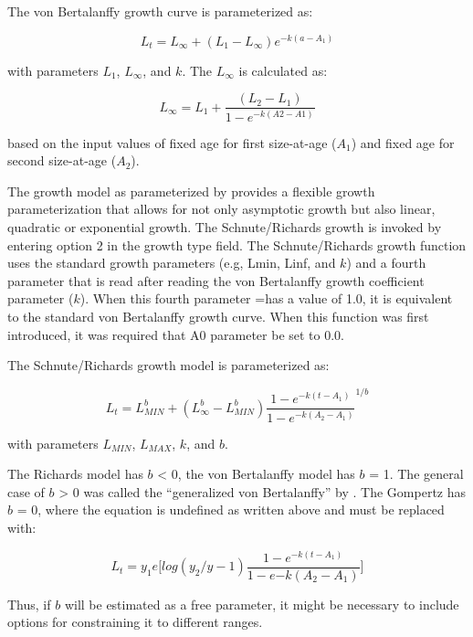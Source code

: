The von Bertalanffy growth curve is parameterized as:

\begin{equation}
	L_t = L_\infty + (L_{1}-L_\infty)e^{-k(a-A_{1})}
\end{equation}

with parameters $L_{1}$, $L_\infty$, and $k$. The $L_\infty$ is calculated as:

\begin{equation}
	L_\infty = L_{1} + \frac{(L_2 - L_1)}{1-e^{-k(A2-A1)}}
\end{equation}

based on the input values of fixed age for first size-at-age ($A_1$) and fixed age for second size-at-age ($A_2$). 

The \citet{richards1959growth} growth model as parameterized by \citet{schnute1981growth} provides a flexible growth parameterization that allows for not only asymptotic growth but also linear, quadratic or exponential growth. The Schnute/Richards growth is invoked by entering option 2 in the growth type field. The Schnute/Richards growth function uses the standard growth parameters (e.g, Lmin, Linf, and $k$) and a fourth parameter that is read after reading the von Bertalanffy growth coefficient parameter ($k$). When this fourth parameter =has a value of 1.0, it is equivalent to the standard von Bertalanffy growth curve. When this function was first introduced, it was required that A0 parameter be set to 0.0.

The Schnute/Richards growth model is parameterized as:

\begin{equation}
		L_t = L_{MIN}^b + (L_\infty^b-L_{MIN}^b)\frac{1-e^{-k(t-A_{1})}}{1-e^{-k(A_2-A_1)}}^{1/b}
\end{equation}

with parameters $L_{MIN}$, $L_{MAX}$, $k$, and $b$.

The Richards model has $b$ < 0, the von Bertalanffy model has $b$ = 1. The general case of $b$ > 0 was called the ``generalized von Bertalanffy'' by \citet{schnute1981growth}. The Gompertz has $b$ = 0, where the equation is undefined as written above and must be replaced with: 

\begin{equation}
		L_t = y_1e\Big[log(y_2/y-1)\frac{1-e^{-k(t-A_1)}}{1-e{-k(A_2-A_1)}}\Big]
\end{equation}

Thus, if $b$ will be estimated as a free parameter, it might be necessary to include options for constraining it to different ranges.

